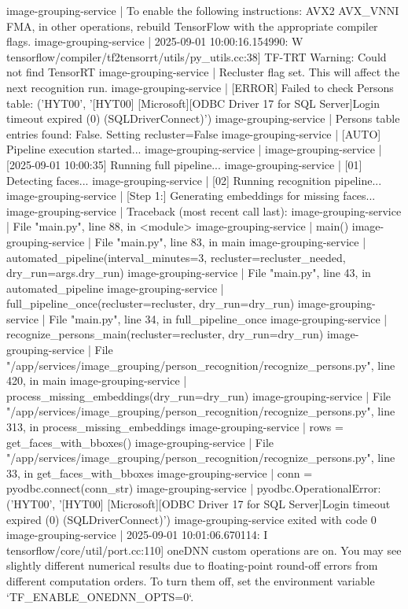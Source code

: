 image-grouping-service  | To enable the following instructions: AVX2 AVX_VNNI FMA, in other operations, rebuild TensorFlow with the appropriate compiler flags.
image-grouping-service  | 2025-09-01 10:00:16.154990: W tensorflow/compiler/tf2tensorrt/utils/py_utils.cc:38] TF-TRT Warning: Could not find TensorRT
image-grouping-service  | Recluster flag set. This will affect the next recognition run.
image-grouping-service  | [ERROR] Failed to check Persons table: ('HYT00', '[HYT00] [Microsoft][ODBC Driver 17 for SQL Server]Login timeout expired (0) (SQLDriverConnect)')
image-grouping-service  | Persons table entries found: False. Setting recluster=False
image-grouping-service  | [AUTO] Pipeline execution started...
image-grouping-service  |
image-grouping-service  | [2025-09-01 10:00:35] Running full pipeline...
image-grouping-service  | [01] Detecting faces...
image-grouping-service  | [02] Running recognition pipeline...
image-grouping-service  | [Step 1:] Generating embeddings for missing faces...
image-grouping-service  | Traceback (most recent call last):
image-grouping-service  |   File "main.py", line 88, in <module>
image-grouping-service  |     main()
image-grouping-service  |   File "main.py", line 83, in main
image-grouping-service  |     automated_pipeline(interval_minutes=3, recluster=recluster_needed, dry_run=args.dry_run)
image-grouping-service  |   File "main.py", line 43, in automated_pipeline
image-grouping-service  |     full_pipeline_once(recluster=recluster, dry_run=dry_run)
image-grouping-service  |   File "main.py", line 34, in full_pipeline_once
image-grouping-service  |     recognize_persons_main(recluster=recluster, dry_run=dry_run)
image-grouping-service  |   File "/app/services/image_grouping/person_recognition/recognize_persons.py", line 420, in main
image-grouping-service  |     process_missing_embeddings(dry_run=dry_run)
image-grouping-service  |   File "/app/services/image_grouping/person_recognition/recognize_persons.py", line 313, in process_missing_embeddings
image-grouping-service  |     rows = get_faces_with_bboxes()
image-grouping-service  |   File "/app/services/image_grouping/person_recognition/recognize_persons.py", line 33, in get_faces_with_bboxes
image-grouping-service  |     conn = pyodbc.connect(conn_str)
image-grouping-service  | pyodbc.OperationalError: ('HYT00', '[HYT00] [Microsoft][ODBC Driver 17 for SQL Server]Login timeout expired (0) (SQLDriverConnect)')
image-grouping-service exited with code 0
image-grouping-service  | 2025-09-01 10:01:06.670114: I tensorflow/core/util/port.cc:110] oneDNN custom operations are on. You may see slightly different numerical results due to floating-point round-off errors from different computation orders. To turn them off, set the environment variable `TF_ENABLE_ONEDNN_OPTS=0`.
